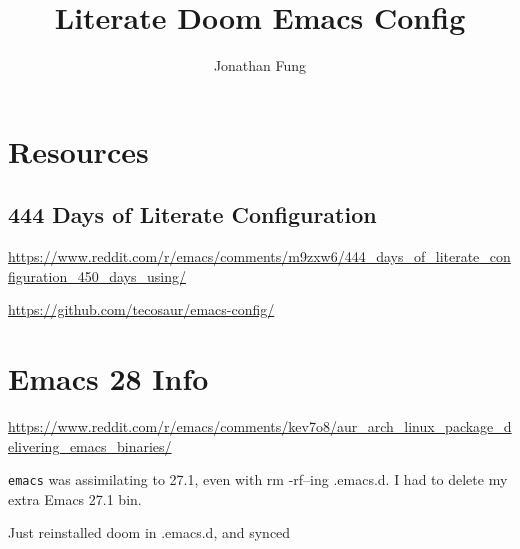 \documentclass[8pt]{article}
\author{Jonathan Fung}
\date{}
\title{Literate Doom Emacs Config}
\begin{document}
\maketitle
\section{Resources}
\label{sec:orgc93b7cb}
\subsection{444 Days of Literate Configuration}
\label{sec:org669e223}
\url{https://www.reddit.com/r/emacs/comments/m9zxw6/444\_days\_of\_literate\_configuration\_450\_days\_using/}

\url{https://github.com/tecosaur/emacs-config/}

\section{Emacs 28 Info}
\label{sec:org9b1ad6b}
\url{https://www.reddit.com/r/emacs/comments/kev7o8/aur\_arch\_linux\_package\_delivering\_emacs\_binaries/}

\texttt{emacs} was assimilating to 27.1, even with rm -rf--ing .emacs.d. I had to delete my extra Emacs 27.1 bin.

Just reinstalled doom in .emacs.d, and synced
\end{document}
